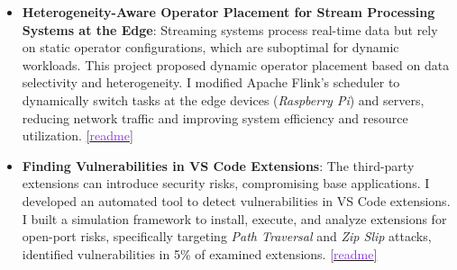 \begin{itemize}
  \item \textbf{Heterogeneity-Aware Operator Placement for Stream Processing Systems at the Edge}: Streaming systems process 
  real-time data but rely on static operator configurations, which are suboptimal for dynamic workloads. This project proposed 
  dynamic operator placement based on data selectivity and heterogeneity. I modified Apache Flink's scheduler to dynamically 
  switch tasks at the edge devices (\textit{Raspberry Pi}) and servers, reducing network traffic and improving system efficiency
   and resource utilization.
  \href{https://shubhamkaushik.com/projects/finding_vulnuerbilities_in_VS_Code_extensions/}{[\textcolor{blueviolet}{readme}]}


  \item \textbf{Finding Vulnerabilities in VS Code Extensions}: The third-party extensions can introduce security risks, 
  compromising base applications. I developed an automated tool to detect vulnerabilities in VS Code extensions. 
  I built a simulation framework to install, execute, and analyze extensions for open-port risks, specifically targeting 
  \textit{Path Traversal} and \textit{Zip Slip} attacks, identified vulnerabilities in 5\% of examined extensions.
  \href{https://shubhamkaushik.com/projects/heterogeneity_aware_operator_placement_for_stream_processing_systems_at_the_edge/}{[\textcolor{blueviolet}{readme}]}
\end{itemize}

